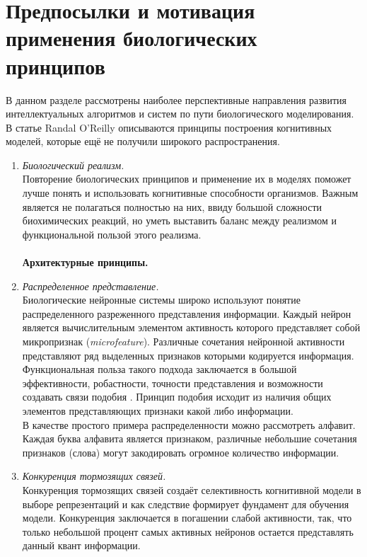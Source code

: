 \section*{Предпосылки и мотивация применения биологических принципов}
В данном разделе рассмотрены наиболее перспективные направления развития интеллектуальных алгоритмов и систем по пути биологического моделирования. В статье Randal O'Reilly \cite{randall98} описываются принципы построения когнитивных моделей, которые ещё не получили широкого распространения.
\begin{enumerate}
\item \textit{Биологический реализм.} \\
Повторение биологических принципов и применение их в моделях поможет лучше понять и использовать когнитивные способности организмов. Важным является не полагаться полностью на них, ввиду большой сложности биохимических реакций, но уметь выставить баланс между реализмом и функциональной пользой этого реализма. \\
\indent \\
\textbf{Архитектурные принципы.}
\item \textit{Распределенное представление.} \\
Биологические нейронные системы широко используют понятие распределенного разреженного представления информации. Каждый нейрон является вычислительным элементом активность которого представляет собой микропризнак (\textit{microfeature}). Различные сочетания нейронной активности представляют ряд выделенных признаков которыми кодируется информация. Функциональная польза такого подхода заключается в большой эффективности, робастности, точности представления и возможности создавать связи подобия \cite{hinton86}. Принцип подобия исходит из наличия общих элементов представляющих признаки какой либо информации. \\ 
В качестве простого примера распределенности можно рассмотреть алфавит. Каждая буква алфавита является признаком, различные небольшие сочетания признаков (слова) могут закодировать огромное количество информации.
\item \textit{Конкуренция тормозящих связей.}\\
Конкуренция тормозящих связей создаёт селективность когнитивной модели в выборе репрезентаций и как следствие формирует фундамент для обучения модели. Конкуренция заключается в погашении слабой активности, так, что только небольшой процент самых активных нейронов остается представлять данный квант информации.\\

\end{enumerate}
